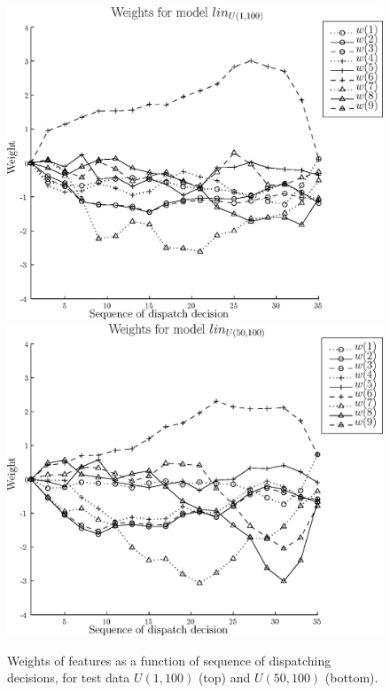 \documentclass[10pt]{llncs}
\begin{document}
\begin{figure}[b!]
\centering
\includegraphics[width=0.85\columnwidth]{figs/fig6_weights0_100.eps}
\includegraphics[width=0.85\columnwidth]{figs/fig6_weights50_100.eps}
\caption{Weights of features as a function of sequence of dispatching decisions, for test data $U(1,100)$ (top) and $U(50,100)$ (bottom).}
\label{fig:variedweights}
\end{figure}


\end{document}
